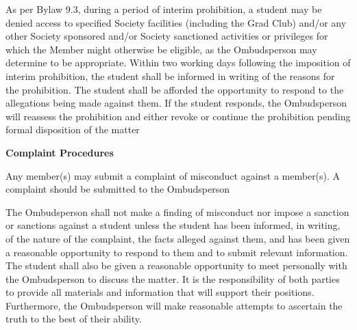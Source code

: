 \begin{longenum}[ label*=\arabic*., align=left]
\begin{longenum}[ label*=\arabic*., align=left]
      As per Bylaw 9.3, during a period of interim prohibition, a student may be denied access to specified Society facilities (including the Grad Club) and/or any other  Society  sponsored and/or  Society  sanctioned  activities  or  privileges  for which the Member might otherwise be eligible, as the Ombudsperson may determine to be appropriate. Within two working  days  following  the  imposition  of  interim  prohibition,  the  student  shall  be  informed  in writing of the reasons for the prohibition. The student shall be afforded the opportunity to respond to the allegations being made against them. If the student responds, the Ombudsperson will reassess the prohibition and either revoke or continue the prohibition pending formal disposition 
of the matter  
\end{longenum}                      
\item \textbf{Complaint Procedures}

     \begin{longenum}[ label*=\arabic*., align=left]

           \item Any  member(s)  may  submit  a  complaint  of  misconduct  against  a  member(s).  A  complaint 
should be submitted to the Ombudsperson
           \item The Ombudsperson shall not make a finding of misconduct nor impose a sanction or sanctions  against  a  student  unless  the  student  has  been  informed,  in  writing,  of  the nature  of  the  complaint,  the  facts  alleged  against  them,  and  has  been  given  a reasonable  opportunity  to  respond  to  them  and  to  submit  relevant  information.  The student  shall also  be  given  a  reasonable  opportunity  to  meet  personally  with  the Ombudsperson to discuss the matter. It is the responsibility of both parties to provide all materials    and    information    that    will    support    their    positions.  Furthermore,    the Ombudsperson  will make  reasonable  attempts  to  ascertain  the  truth  to  the  best  of  their ability. 
           

\end{longenum}
\end{longenum}

